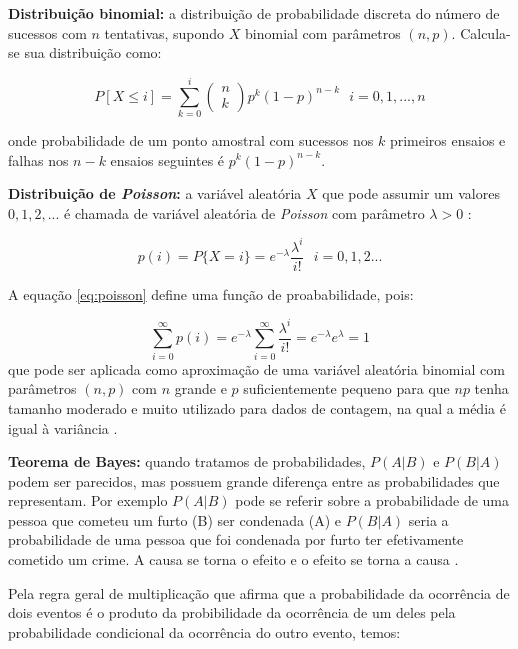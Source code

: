 \documentclass[
  openany]{book}
\begin{document}
\textbf{Distribuição binomial:} a distribuição de probabilidade discreta do número de sucessos com \(n\) tentativas, supondo \(X\) binomial com parâmetros \((n,p)\). Calcula-se sua distribuição como:

\begin{equation}
    P[X\leq i]=\displaystyle \sum_{k=0}^i \begin{pmatrix}n\\k \end{pmatrix}p^k(1-p)^{n-k} \ \ \ i=0,1,...,n
    \label{eq:fbinominal}
\end{equation}

onde probabilidade de um ponto amostral com sucessos nos \(k\) primeiros ensaios e falhas nos \(n−k\) ensaios seguintes é \(p^k(1−p)^{n−k}\).

\textbf{Distribuição de \emph{Poisson}:} a variável aleatória \(X\) que pode assumir um valores \(0,1,2,...\) é chamada de variável aleatória de \emph{Poisson} com parâmetro \(\lambda>0\) \citep{rossprobability}:

\begin{equation}
    p(i)=P\{X=i\}=e^{-\lambda}\frac{\lambda^i}{i!} \ \ \ i=0,1,2...
    \label{eq:poisson}
\end{equation}

A equação \eqref{eq:poisson} define uma função de proababilidade, pois:

\[\displaystyle \sum^\infty_{i=0}p(i)=e^{-\lambda}\sum^\infty_{i=0} \frac{\lambda^i}{i!} = e^{-\lambda}e^\lambda=1\]
que pode ser aplicada como aproximação de uma variável aleatória binomial com parâmetros \((n,p)\) com \(n\) grande e \(p\) suficientemente pequeno para que \(np\) tenha tamanho moderado e muito utilizado para dados de contagem, na qual a média é igual à variância \citep{banzatto1992experimentaccao}.

\textbf{Teorema de Bayes:} quando tratamos de probabilidades, \(P(A|B)\) e \(P(B|A)\) podem ser parecidos, mas possuem grande diferença entre as probabilidades que representam. Por exemplo \(P(A|B)\) pode se referir sobre a probabilidade de uma pessoa que cometeu um furto (B) ser condenada (A) e \(P(B|A)\) seria a probabilidade de uma pessoa que foi condenada por furto ter efetivamente cometido um crime. A causa se torna o efeito e o efeito se torna a causa \citep{freund2009estatistica}.

Pela regra geral de multiplicação que afirma que a probabilidade da ocorrência de dois eventos é o produto da probibilidade da ocorrência de um deles pela probabilidade condicional da ocorrência do outro evento, temos:
\end{document}
